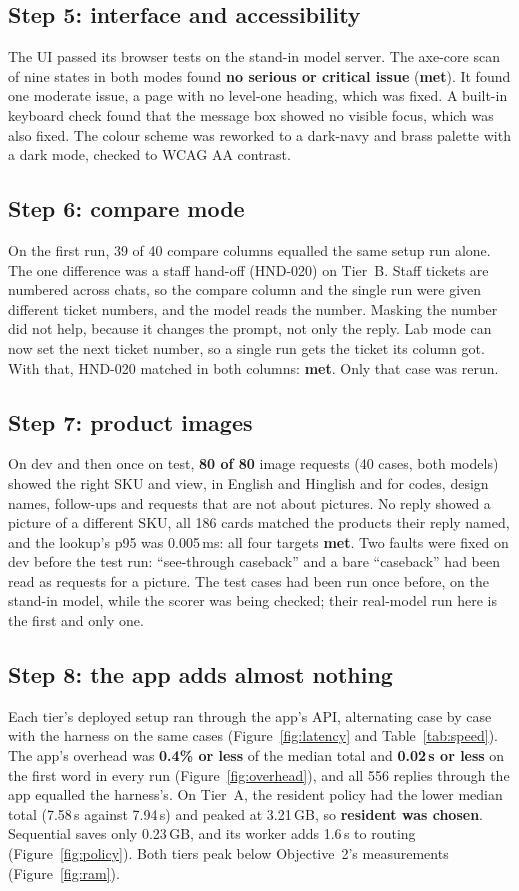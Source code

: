 \documentclass[11pt,a4paper]{article}
\newcommand{\met}{\textcolor{qaqua}{\textbf{met}}}
\begin{document}
\subsection{Step 5: interface and accessibility}
The UI passed its browser tests on the stand-in model server. The axe-core scan of nine states in both modes found
\textbf{no serious or critical issue} (\met). It found one moderate issue, a page with no level-one heading, which was
fixed. A built-in keyboard check found that the message box showed no visible focus, which was also fixed. The colour
scheme was reworked to a dark-navy and brass palette with a dark mode, checked to WCAG AA contrast.

\subsection{Step 6: compare mode}
On the first run, 39 of 40 compare columns equalled the same setup run alone. The one difference was a staff hand-off
(HND-020) on Tier~B. Staff tickets are numbered across chats, so the compare column and the single run were given
different ticket numbers, and the model reads the number. Masking the number did not help, because it changes the
prompt, not only the reply. Lab mode can now set the next ticket number, so a single run gets the ticket its column got.
With that, HND-020 matched in both columns: \met. Only that case was rerun.

\subsection{Step 7: product images}
On dev and then once on test, \textbf{80 of 80} image requests (40 cases, both models) showed the right SKU and view, in
English and Hinglish and for codes, design names, follow-ups and requests that are not about pictures. No reply showed a
picture of a different SKU, all 186 cards matched the products their reply named, and the lookup's p95 was 0.005\,ms:
all four targets \met. Two faults were fixed on dev before the test run: ``see-through caseback'' and a bare
``caseback'' had been read as requests for a picture. The test cases had been run once before, on the stand-in model,
while the scorer was being checked; their real-model run here is the first and only one.

\subsection{Step 8: the app adds almost nothing}\label{sec:speed}
Each tier's deployed setup ran through the app's API, alternating case by case with the harness on the same cases
(Figure~\ref{fig:latency} and Table~\ref{tab:speed}). The app's overhead was \textbf{0.4\% or less} of the median total
and \textbf{0.02\,s or less} on the first word in every run (Figure~\ref{fig:overhead}), and all 556 replies through the
app equalled the harness's. On Tier~A, the resident policy had the lower median total (7.58\,s against 7.94\,s) and
peaked at 3.21\,GB, so \textbf{resident was chosen}. Sequential saves only 0.23\,GB, and its worker adds 1.6\,s to
routing (Figure~\ref{fig:policy}). Both tiers peak below Objective~2's measurements (Figure~\ref{fig:ram}).
\end{document}
